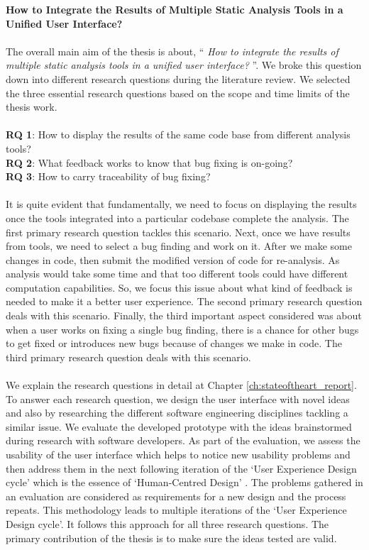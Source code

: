 \textbf{How to Integrate the Results of Multiple Static Analysis Tools in a Unified User Interface?}
\\ \\
The overall main aim of the thesis is about, “ \textit{How to integrate the results of multiple static analysis tools in a unified user interface?} ”. We broke this question down into different research questions during the literature review. We selected the three essential research questions based on the scope and time limits of the thesis work. \\ \\

\noindent\textbf{RQ 1}: How to display the results of the same code base from different analysis tools? \\
\textbf{RQ 2}: What feedback works to know that bug fixing is on-going? \\
\textbf{RQ 3}: How to carry traceability of bug fixing? \\ \\

It is quite evident that fundamentally, we need to focus on displaying the results once the tools integrated into a particular codebase complete the analysis. The first primary research question tackles this scenario. Next, once we have results from tools, we need to select a bug finding and work on it. After we make some changes in code, then submit the modified version of code for re-analysis. As analysis would take some time and that too different tools could have different computation capabilities. So, we focus this issue about what kind of feedback is needed to make it a better user experience. The second primary research question deals with this scenario. Finally, the third important aspect considered was about when a user works on fixing a single bug finding, there is a chance for other bugs to get fixed or introduces new bugs because of changes we make in code. The third primary research question deals with this scenario. \\ \\

We explain the research questions in detail at Chapter \ref{ch:stateoftheart_report}. To answer each research question, we design the user interface with novel ideas and also by researching the different software engineering disciplines tackling a similar issue. We evaluate the developed prototype with the ideas brainstormed during research with software developers. As part of the evaluation, we assess the usability \cite{usability} of the user interface which helps to notice new usability problems and then address them in the next following iteration of the ‘User Experience Design cycle’ \cite{UXD} which is the essence of ‘Human-Centred Design’ \cite{hcd}. The problems gathered in an evaluation are considered as requirements for a new design and the process repeats. This methodology leads to multiple iterations of the ‘User Experience Design cycle’. It follows this approach for all three research questions. The primary contribution of the thesis is to make sure the ideas tested are valid. \\ \\



